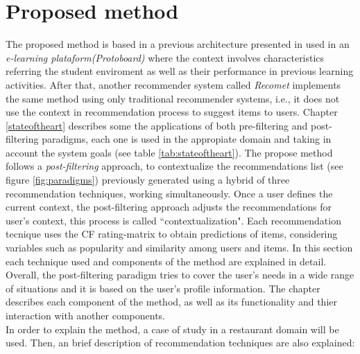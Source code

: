 \chapter{Proposed method}\label{method}

The proposed method is based  in a previous architecture presented in
\cite{garcia2009hybrid} used in an \textit{e-learning plataform(Protoboard)}
where the context  involves characteristics referring the student
enviroment as well as their performance in previous learning activities.  
After that,
another recommender system called \textit{Recomet}\cite{ramirez2013restaurant}
implements the same method using only traditional recommender systems,
i.e., it does not use the context in recommendation process  to
suggest items to users.  
Chapter \ref{stateoftheart} describes some the applications of both pre-filtering and 
post-filtering paradigms, each one is used in the appropiate domain 
and taking in account the system goals (see table \ref{tab:stateoftheart}).  
The propose method follows a \textit{post-filtering} approach, to contextualize
the recommendations list
(see figure \ref{fig:paradigms}) previously generated using a hybrid
of three recommendation techniques, working simultaneously.
Once a user defines the current context, the post-filtering approach
adjusts the  recommendations for user's context, this process is called
``contextualization". 
Each recommendation tecnique uses the CF rating-matrix 
to obtain  predictions of items, considering variables such as
popularity and similarity among users and items. In this section
each technique used and components of the method are explained in
detail.\\  Overall, the 
post-filtering paradigm tries to cover the  user's needs in a wide range of
situations and it is based on the user's profile information. The
chapter describes  each component of the  method, as well as its
functionality and thier interaction with  another components.\\ 
In order to explain the method, a case of study in a
restaurant   domain will be used. Then, an brief description of
recommendation  techniques are also explained: 
